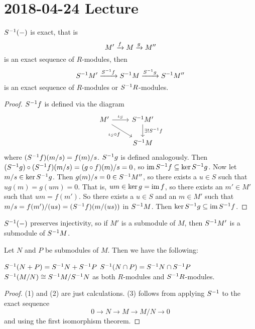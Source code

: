 \section{2018-04-24 Lecture}

\begin{prop}[2.6]
  $S^{-1}(-)$ is exact, that is
  \[M' \xrightarrow{f} M \xrightarrow{g} M''\]
  is an exact sequence of $R$-modules, then
  \[S^{-1} M' \xrightarrow{S^{-1} f} S^{-1} M \xrightarrow{S^{-1} g} S^{-1} M''\]
  is an exact sequence of $R$-modules or $S^{-1} R$-modules.
\end{prop}

\begin{proof}
  $S^{-1} f$ is defined via the diagram
  \[\begin{tikzcd}
    M' \arrow[rd, "\iota_S \circ f"'] \arrow[r, "\iota_S"] & S\inv M' \arrow[d, "\exists ! S\inv f"] \\
     & S\inv M
  \end{tikzcd}\]
  where $(S^{-1} f)(m/s) = f(m)/s$.
  $S^{-1} g$ is defined analogously.
  Then $(S^{-1} g) \circ (S^{-1} f) (m/s) = (g \circ f)(m)/s = 0$, so $\operatorname{im} S^{-1} f \subseteq \ker S^{-1} g$.
  Now let $m/s \in \ker S^{-1} g$.
  Then $g(m)/s = 0 \in S^{-1} M''$, so there exists a $u \in S$ such that $ug(m)=g(um)=0$.
  That is, $um \in \ker g = \operatorname{im} f$, so there exists an $m' \in M'$ such that $um=f(m')$.
  So there exists a $u \in S$ and an $m \in M'$ such that $m/s = f(m')/(us) = (S^{-1} f)(m/(us))$ in $S^{-1} M$.
  Then $\ker S^{-1} g \subseteq \operatorname{im} S^{-1} f$.
\end{proof}

\begin{rmk}
  $S^{-1}(-)$ preserves injectivity, so if $M'$ is a submodule of $M$, then $S^{-1} M'$ is a submodule of $S^{-1} M$.
\end{rmk}

\begin{cor}
  Let $N$ and $P$ be submodules of $M$.
  Then we have the following:
  \begin{enum}
    \io $S^{-1}(N+P)=S^{-1} N + S^{-1} P$
    \io $S^{-1}(N \cap P) = S^{-1} N \cap S^{-1} P$
    \io $S^{-1}(M/N) \cong S^{-1} M / S^{-1} N$ as both $R$-modules and $S^{-1} R$-modules.
  \end{enum}
\end{cor}

\begin{proof}
  (1) and (2) are just calculations.
  (3) follows from applying $S^{-1}$ to the exact sequence
  \[0 \to N \to M \to M/N \to 0\]
  and using the first isomorphism theorem.
\end{proof}


